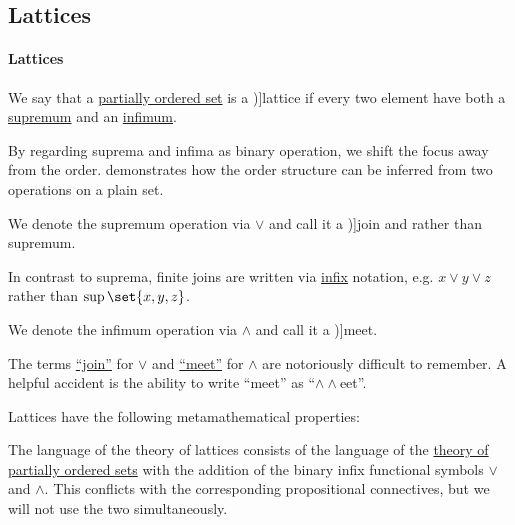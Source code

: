 \subsection{Lattices}\label{subsec:lattices}

\paragraph{Lattices}

\begin{definition}\label{def:lattice}
  We say that a \hyperref[def:partially_ordered_set]{partially ordered set} is a \term[ru=решётка (\cite[def. 4.2]{Гуров2013})]{lattice} if every two element have both a \hyperref[def:extremal_points/supremum_and_infimum]{supremum} and an \hyperref[def:extremal_points/supremum_and_infimum]{infimum}.

  By regarding suprema and infima as binary operation, we shift the focus away from the order.  demonstrates how the order structure can be inferred from two operations on a plain set.

  \begin{thmenum}[series=def:lattice]
     We denote the supremum operation via \( \vee \) and call it a \term[ru=объединение (\cite[def. 4.2]{Гуров2013})]{join} and rather than supremum.

    In contrast to suprema, finite joins are written via \hyperref[rem:first_order_formula_conventions/infix]{infix} notation, e.g. \( x \vee y \vee z \) rather than \( \sup\set{ x, y, z } \).

     We denote the infimum operation via \( \wedge \) and call it a \term[ru=сечение (\cite[def. 4.2]{Гуров2013})]{meet}.
  \end{thmenum}

  The terms \hyperref[def:lattice/join]{\enquote{join}} for \( \vee \) and \hyperref[def:lattice/meet]{\enquote{meet}} for \( \wedge \) are notoriously difficult to remember. A helpful accident is the ability to write \enquote{meet} as \enquote{\( \wedge \wedge \)eet}.

  Lattices have the following metamathematical properties:
  \begin{thmenum}[resume=def:lattice]
     The language of the theory of lattices consists of the language of the \hyperref[def:partially_ordered_set]{theory of partially ordered sets} with the addition of the binary infix functional symbols \( \vee \) and \( \wedge \). This conflicts with the corresponding propositional connectives, but we will not use the two simultaneously.


\end{thmenum}
\end{definition}

